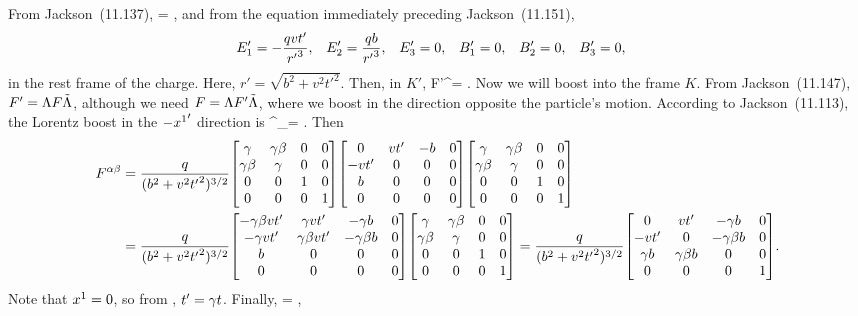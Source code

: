\newcommand{\Fmat}{\mqty[	0 & -\Eq & -\Ew & -\Ee \\
						\Eq & 0 & -\Be & \Bw \\
						\Ew & \Be & 0 & -\Bq \\
						\Ee & -\Bw & \Bq & 0 ]}
\newcommand{\Fpab}{{F'}^{\alp\bet}}
\newcommand{\rp}{{r'}}
\newcommand{\tLam}{\tilde{\Lam}}
\newcommand{\Lammat}{\mqty[\gam & \gam \beta & 0 & 0 \\	
						\gam \beta & \gam & 0 & 0 \\
						0 & 0 & 1 & 0 \\
						0 & 0 & 0 & 1 ]}

\begin{solution}
	From Jackson~(11.137),
	\beqn \label{F}
		\Fab = \Fmat,
	\eeqn
	and from the equation immediately preceding Jackson~(11.151),
	\begin{align*}
		\Eq' &= -\frac{q v t'}{\rp^3}, &
		\Ew' &= \frac{q b}{\rp^3}, &
		\Ee' &= 0, &
		\Bq' &= 0, &
		\Bw' &= 0, &
		\Be' &= 0,
	\end{align*}
	in the rest frame of the charge.  Here, $r' = \sqrt{b^2 + v^2 {t'}^2}$.  Then, in $K'$,
	\beqn \label{thing2.1b}
		\Fpab = 
			\mqty[0 & v t' & -b & 0 \\
				-v t' & 0 & 0 & 0 \\
				b & 0 & 0 & 0 \\
				0 & 0 & 0 & 0 ].
	\eeqn
	Now we will boost into the frame $K$.  From Jackson~(11.147), $F' = \Lam F \tLam$, although we need $F = \Lam F' \tLam$, where we boost in the direction opposite the particle's motion.  According to Jackson~(11.113), the Lorentz boost in the $-{x^1}'$ direction is
	\beqn \label{Lam2}
		\Lam^\alp_\bet = \Lammat.
	\eeqn
	Then
	\begin{align*}
		\Fab &= \frac{q}{(b^2 + v^2 {t'}^2)^{3/2}} \Lammat
			\mqty[ 0 & v t' & -b & 0 \\
				-v t' & 0 & 0 & 0 \\
				b & 0 & 0 & 0 \\
				0 & 0 & 0 & 0 ]
			\Lammat \\
		&= \frac{q}{(b^2 + v^2 {t'}^2)^{3/2}}
			\mqty[ -\gam \bet v t' & \gam v t' & -\gam b & 0 \\
				-\gam v t' & \gam \bet v t' & -\gam \bet b & 0 \\
				b & 0 & 0 & 0 \\
				0 & 0 & 0 & 0 ]
			\Lammat
		= \frac{q}{(b^2 + v^2 {t'}^2)^{3/2}}
			\mqty[ 0 & v t' & -\gam b & 0 \\
				-v t' & 0 & -\gam \bet b & 0 \\
				\gam b & \gam \bet b & 0 & 0 \\
				0 & 0 & 0 & 1 ].
	\end{align*}
	Note that $x^1 = 0$, so from , $t' = \gamma t$.  Finally,
	\beqn \label{thing2.1}
		\Fab =  
			\mqty[0 & v t & -b & 0 \\
				-v t & 0 & -v b / c & 0 \\
				b & v b / c & 0 & 0 \\
				0 & 0 & 0 & 0 ],
	\eeqn
	

\end{solution}
